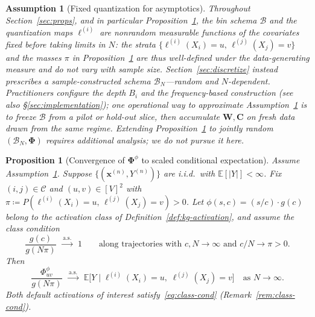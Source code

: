 \documentclass[11pt]{article}
\newtheorem{proposition}{Proposition}
\newtheorem{assumption}{Assumption}
\begin{document}
\begin{assumption}[Fixed quantization for asymptotics]
\label{asm:fixed-bins}
Throughout Section~\ref{sec:props}, and in particular Proposition~\ref{prop:convergence}, the bin schema $\mathcal{B}$ and the quantization maps $\ell^{(i)}$ are \emph{nonrandom} measurable functions of the covariates fixed \emph{before} taking limits in $N$: the strata $\{\ell^{(i)}(X_i)=u,\,\ell^{(j)}(X_j)=v\}$ and the masses $\pi$ in Proposition~\ref{prop:convergence} are thus well-defined under the data-generating measure and do not vary with sample size.
Section~\ref{sec:discretize} instead prescribes a sample-constructed schema $\mathcal{B}_N$---random and $N$-dependent.
Practitioners configure the depth $B_i$ and the frequency-based construction (see also \S\ref{sec:implementation}); one operational way to approximate Assumption~\ref{asm:fixed-bins} is to freeze $\mathcal{B}$ from a pilot or hold-out slice, then accumulate $\bm{W},\bm{C}$ on fresh data drawn from the same regime.
Extending Proposition~\ref{prop:convergence} to jointly random $(\mathcal{B}_N,\bm{\Phi})$ requires additional analysis; we do not pursue it here.
\end{assumption}

\begin{proposition}[Convergence of $\bm{\Phi}^\phi$ to scaled conditional expectation]
\label{prop:convergence}
Assume Assumption~\ref{asm:fixed-bins}.
Suppose $\{(\bm{x}^{(n)}, Y^{(n)})\}$ are i.i.d.\ with $\mathbb{E}[|Y|] < \infty$.
Fix $(i,j) \in \mathcal{C}$ and $(u,v) \in [V]^2$ with $\pi \coloneqq P(\ell^{(i)}(X_i)=u,\,\ell^{(j)}(X_j)=v) > 0$.
Let $\phi(s, c) = (s/c) \cdot g(c)$ belong to the activation class of Definition~\ref{def:kg-activation}, and assume the \emph{class condition}
\begin{equation}
  \frac{g(c)}{g(N\pi)} \;\xrightarrow{\;\mathrm{a.s.}\;}\; 1
  \qquad \text{along trajectories with } c, N \to \infty \text{ and } c/N \to \pi > 0.
  \label{eq:class-cond}
\end{equation}
Then
\begin{equation}
  \frac{\Phi^\phi_{uv}}{g(N\pi)}
  \;\xrightarrow{\;\mathrm{a.s.}\;}\;
  \mathbb{E}\!\bigl[Y \mid \ell^{(i)}(X_i)=u,\;\ell^{(j)}(X_j)=v\bigr]
  \quad\text{as } N\to\infty.
  \label{eq:convergence}
\end{equation}
Both default activations of interest satisfy~\eqref{eq:class-cond} (Remark~\ref{rem:class-cond}).
\end{proposition}
\end{document}

